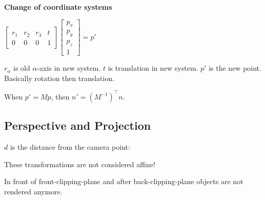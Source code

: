 \textbf{Change of coordinate systems}
\vspace{-10pt}
\begin{multicols}{2}
  \(\begin{bmatrix}
    r_1 & r_2 & r_3 & t \\
    0 & 0 & 0 & 1
  \end{bmatrix} \begin{bmatrix}
    p_x \\ p_y \\ p_z \\ 1
  \end{bmatrix} = p'\)

  \(r_\alpha\) is old \(\alpha\)-axis in new system.
  \(t\) is translation in new system.
  \(p'\) is the new point.
  Basically rotation then translation.
\end{multicols}

\vspace{-10pt}
\begin{definition}
  When \(p' = Mp\), then \(n' = (M^{-1})^\top n\).
\end{definition}

\subsection{Perspective and Projection}
\(d\) is the distance from the camera point:


\begin{theorem}
  These transformations are not considered affine!
\end{theorem}

\begin{definition}
  In front of front-clipping-plane and after back-clipping-plane objects are not rendered anymore.
\end{definition}

